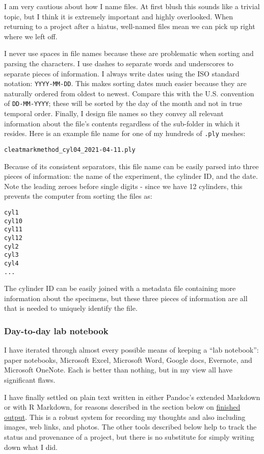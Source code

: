 \documentclass[
  letterpaper,
  openany]{book}
\begin{document}
I am very cautious about how I name files.
At first blush this sounds like a trivial topic, but I think it is extremely important and highly overlooked.
When returning to a project after a hiatus, well-named files mean we can pick up right where we left off.

I never use spaces in file names because these are problematic when sorting and parsing the characters.
I use dashes to separate words and underscores to separate pieces of information.
I always write dates using the ISO standard notation: \texttt{YYYY-MM-DD}.
This makes sorting dates much easier because they are naturally ordered from oldest to newest.
Compare this with the U.S. convention of \texttt{DD-MM-YYYY}; these will be sorted by the day of the month and not in true temporal order.
Finally, I design file names so they convey all relevant information about the file's contents regardless of the sub-folder in which it resides.
Here is an example file name for one of my hundreds of \texttt{.ply} meshes:

\texttt{cleatmarkmethod\_cyl04\_2021-04-11.ply}

Because of its consistent separators, this file name can be easily parsed into three pieces of information: the name of the experiment, the cylinder ID, and the date.
Note the leading zeroes before single digits - since we have 12 cylinders, this prevents the computer from sorting the files as:

\begin{verbatim}
cyl1
cyl10
cyl11
cyl12
cyl2
cyl3
cyl4
...
\end{verbatim}

The cylinder ID can be easily joined with a metadata file containing more information about the specimens, but these three pieces of information are all that is needed to uniquely identify the file.

\hypertarget{lab-notebook}{%
\subsubsection{Day-to-day lab notebook}\label{lab-notebook}}

I have iterated through almost every possible means of keeping a ``lab notebook'': paper notebooks, Microsoft Excel, Microsoft Word, Google docs, Evernote, and Microsoft OneNote.
Each is better than nothing, but in my view all have significant flaws.

I have finally settled on plain text written in either Pandoc's extended Markdown or with R Markdown, for reasons described in the section below on \protect\hyperlink{r-markdown-finished-output}{finished output}.
This is a robust system for recording my thoughts and also including images, web links, and photos.
The other tools described below help to track the status and provenance of a project, but there is no substitute for simply writing down what I did.
\end{document}

